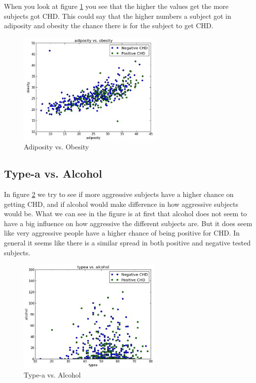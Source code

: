 When you look at figure \ref{ObeAsi} you see that the higher the values get the more subjects got CHD. This could say that the higher numbers a subject got in adiposity and obesity the chance there is for the subject to get CHD.

\begin{figure}[H]
\centering
\includegraphics[width=7cm, keepaspectratio=true]{pictures/adiposityObesity.png}
\vspace{-0.4cm}
\caption{\footnotesize Adiposity vs. Obesity}
\label{ObeAsi}
\end{figure}

\subsection{Type-a vs. Alcohol}

In figure \ref{typeAlco} we try to see if more aggressive subjects have a higher chance on getting CHD, and if alcohol would make difference in how aggressive subjects would be. What we can see in the figure is at first that alcohol does not seem to have a big influence on how aggressive the different subjects are. But it does seem like very aggressive people have a higher chance of being positive for CHD. In general it seems like there is a similar spread in both positive and negative tested subjects.

\begin{figure}[H]
\centering
\includegraphics[width=7cm, keepaspectratio=true]{pictures/typeaalcohol.png}
\vspace{-0.4cm}
\caption{\footnotesize Type-a vs. Alcohol}
\label{typeAlco}
\end{figure}